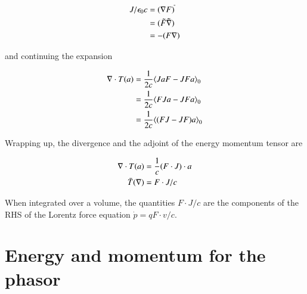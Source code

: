 \begin{align*}
J/\epsilon_0 c
&= (\nabla F)^{\tilde{}} \\
&= (\tilde{F} \tilde{\nabla}) \\
&= -(F \nabla)
\end{align*}

and continuing the expansion

\begin{align*}
\nabla \cdot T(a)
&= \frac{1}{2c} {\left\langle{{ J a F - J F a }}\right\rangle}_{0} \\
&= \frac{1}{2c} {\left\langle{{ F J a - J F a }}\right\rangle}_{0} \\
&= \frac{1}{2c} {\left\langle{{ (F J - J F) a }}\right\rangle}_{0} \\
\end{align*}

Wrapping up, the divergence and the adjoint of the energy momentum tensor are

\begin{align}
\nabla \cdot T(a) &= \frac{1}{c} (F \cdot J) \cdot a \\
\bar{T}(\nabla) &= F \cdot J/c
\end{align}

When integrated over a volume, the quantities $F \cdot J/c$ are the components of the RHS of the Lorentz force equation $\dot{p} = q F \cdot v/c$.

\section{Energy and momentum for the phasor}

\EndArticle
